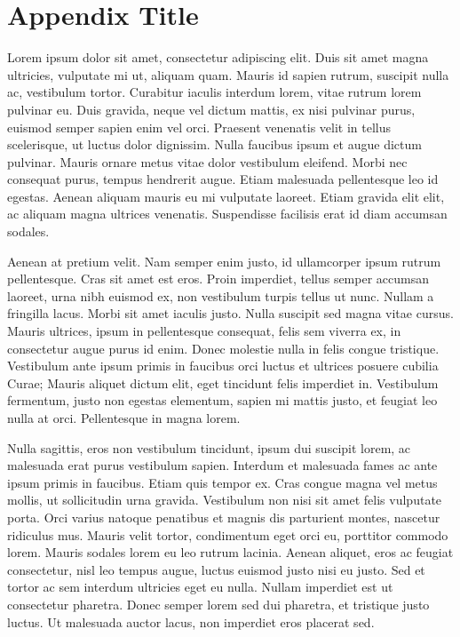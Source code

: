 \chapter{Appendix Title}

Lorem ipsum dolor sit amet, consectetur adipiscing elit. Duis sit amet magna ultricies, vulputate mi ut, aliquam quam. Mauris id sapien rutrum, suscipit nulla ac, vestibulum tortor. Curabitur iaculis interdum lorem, vitae rutrum lorem pulvinar eu. Duis gravida, neque vel dictum mattis, ex nisi pulvinar purus, euismod semper sapien enim vel orci. Praesent venenatis velit in tellus scelerisque, ut luctus dolor dignissim. Nulla faucibus ipsum et augue dictum pulvinar. Mauris ornare metus vitae dolor vestibulum eleifend. Morbi nec consequat purus, tempus hendrerit augue. Etiam malesuada pellentesque leo id egestas. Aenean aliquam mauris eu mi vulputate laoreet. Etiam gravida elit elit, ac aliquam magna ultrices venenatis. Suspendisse facilisis erat id diam accumsan sodales.

Aenean at pretium velit. Nam semper enim justo, id ullamcorper ipsum rutrum pellentesque. Cras sit amet est eros. Proin imperdiet, tellus semper accumsan laoreet, urna nibh euismod ex, non vestibulum turpis tellus ut nunc. Nullam a fringilla lacus. Morbi sit amet iaculis justo. Nulla suscipit sed magna vitae cursus. Mauris ultrices, ipsum in pellentesque consequat, felis sem viverra ex, in consectetur augue purus id enim. Donec molestie nulla in felis congue tristique. Vestibulum ante ipsum primis in faucibus orci luctus et ultrices posuere cubilia Curae; Mauris aliquet dictum elit, eget tincidunt felis imperdiet in. Vestibulum fermentum, justo non egestas elementum, sapien mi mattis justo, et feugiat leo nulla at orci. Pellentesque in magna lorem.

Nulla sagittis, eros non vestibulum tincidunt, ipsum dui suscipit lorem, ac malesuada erat purus vestibulum sapien. Interdum et malesuada fames ac ante ipsum primis in faucibus. Etiam quis tempor ex. Cras congue magna vel metus mollis, ut sollicitudin urna gravida. Vestibulum non nisi sit amet felis vulputate porta. Orci varius natoque penatibus et magnis dis parturient montes, nascetur ridiculus mus. Mauris velit tortor, condimentum eget orci eu, porttitor commodo lorem. Mauris sodales lorem eu leo rutrum lacinia. Aenean aliquet, eros ac feugiat consectetur, nisl leo tempus augue, luctus euismod justo nisi eu justo. Sed et tortor ac sem interdum ultricies eget eu nulla. Nullam imperdiet est ut consectetur pharetra. Donec semper lorem sed dui pharetra, et tristique justo luctus. Ut malesuada auctor lacus, non imperdiet eros placerat sed.

